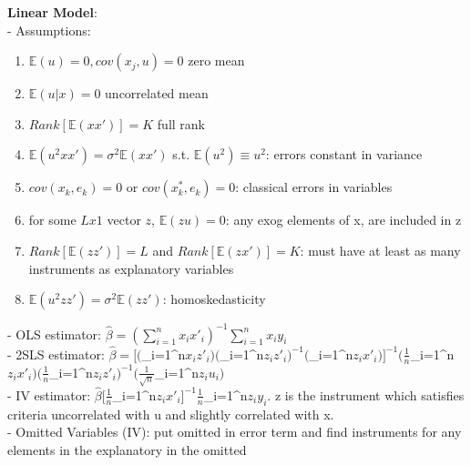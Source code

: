 \documentclass[1pt, a4paper]{article}
\newcommand{\sumt}{$\sum\limits_{i=1}^n$}
\newcommand{\EE}{\mathbb E}
\begin{document}
\noindent
\textbf{Linear Model}: \\
- Assumptions:
\begin{enumerate}
  \item $\EE(u)=0, cov(x_j, u) = 0$ zero mean
  \item $\EE(u|x) = 0$ uncorrelated mean
  \item $Rank[\EE(xx')] = K$ full rank
  \item $\EE(u^2xx') = \sigma^2\EE(xx')$ s.t. $\EE(u^2)\equiv u^2$: errors constant in variance
  \item $cov(x_k,e_k) = 0$ or $cov(x_k^*,e_k)=0$: classical errors in variables 
  \item for some $Lx1$ vector $z$, $\EE(zu)=0$: any exog elements of x, are included in z
  \item $Rank[\EE(zz')]=L$ and $Rank[\EE(zx')]=K$: must have at least as many instruments as explanatory variables 
  \item $\EE(u^2zz')=\sigma^2\EE(zz')$: homoskedasticity
\end{enumerate}
- OLS estimator: $\hat{\beta}=(\sum\limits_{i=1}^nx_ix'_i)^{-1}\sum\limits_{i=1}^nx_iy_i$ \\
- 2SLS estimator: $\hat{\beta}=[(\sumt x_iz'_i)(\sumt z_iz'_i)^{-1}(\sumt z_ix'_i)]^{-1}(\frac{1}{n}\sumt z_ix'_i)(\frac{1}{n}\sumt z_iz'_i)^{-1}(\frac{1}{\sqrt{n}}\sumt z_iu_i)$ \\ 
- IV estimator: $\hat{\beta}[\frac{1}{n}\sumt z_ix'_i]^{-1}\frac{1}{n}\sumt z_iy_i$. z is the instrument which satisfies criteria uncorrelated with u and slightly correlated with x. \\
- Omitted Variables (IV): put omitted in error term and find instruments for any elements in the explanatory in the omitted \\
\end{document}
